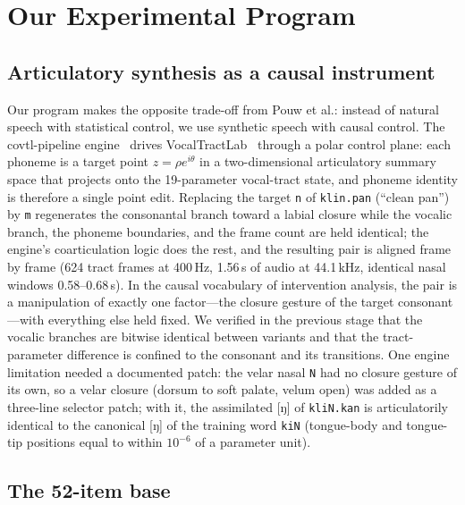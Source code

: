 \documentclass[11pt,a4paper]{article}
\newcommand{\sampa}[1]{\texttt{#1}}
\begin{document}
\needspace{0.22\textheight}
\section{Our Experimental Program}\label{sec:program}

\subsection{Articulatory synthesis as a causal instrument}

Our program makes the opposite trade-off from Pouw et al.: instead of
natural speech with statistical control, we use synthetic speech with
causal control. The covtl-pipeline engine~\citep{berthommier2026}
drives VocalTractLab~\citep{birkholz2013} through a polar control
plane: each phoneme is a target point $z=\rho e^{i\theta}$ in a
two-dimensional articulatory summary space that projects onto the
19-parameter vocal-tract state, and phoneme identity is therefore a
single point edit. Replacing the target \sampa{n} of \sampa{klin.pan}
(``clean pan'') by \sampa{m} regenerates the consonantal branch
toward a labial closure while the vocalic branch, the phoneme
boundaries, and the frame count are held identical; the engine's
coarticulation logic does the rest, and the resulting pair is aligned
frame by frame (624 tract frames at 400\,Hz, 1.56\,s of audio at
44.1\,kHz, identical nasal windows 0.58--0.68\,s). In the causal
vocabulary of intervention analysis, the pair is a manipulation of
exactly one factor---the closure gesture of the target consonant---with
everything else held fixed. We verified in the previous stage that the
vocalic branches are bitwise identical between variants and that the
tract-parameter difference is confined to the consonant and its
transitions. One engine limitation needed a documented patch: the velar
nasal \sampa{N} had no closure gesture of its own, so a velar closure
(dorsum to soft palate, velum open) was added as a three-line selector
patch; with it, the assimilated [ŋ] of \sampa{kliN.kan} is
articulatorily identical to the canonical [ŋ] of the training word
\sampa{kiN} (tongue-body and tongue-tip positions equal to within
$10^{-6}$ of a parameter unit).

\subsection{The 52-item base}
\end{document}
